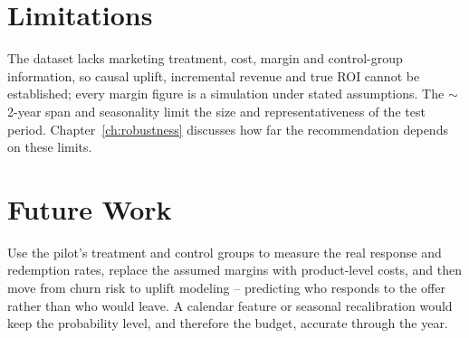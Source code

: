 \section{Limitations}
\label{sec:10-4}

The dataset lacks marketing treatment, cost, margin and control-group information, so causal uplift, incremental revenue and true ROI cannot be established; every margin figure is a simulation under stated assumptions. The $\sim$2-year span and seasonality limit the size and representativeness of the test period. Chapter~\ref{ch:robustness} discusses how far the recommendation depends on these limits.

\section{Future Work}
\label{sec:10-5}

Use the pilot's treatment and control groups to measure the real response and redemption rates, replace the assumed margins with product-level costs, and then move from churn risk to uplift modeling -- predicting who responds to the offer rather than who would leave. A calendar feature or seasonal recalibration would keep the probability level, and therefore the budget, accurate through the year.

